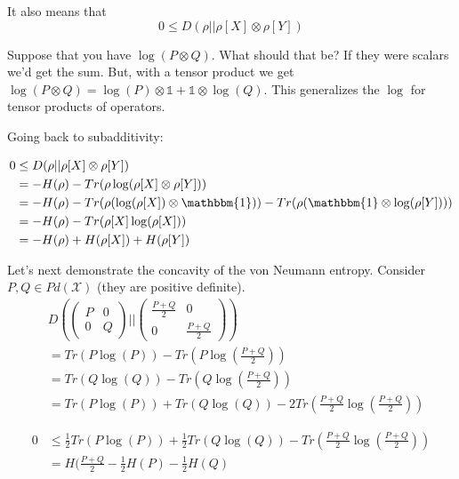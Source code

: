 \documentclass{article}
\begin{document}
        It also means that 
        \[ 
                0 \le D(\rho || \rho[X]\otimes \rho[Y]) 
        \]
        
        Suppose that you have $\log(P \otimes Q)$. What should that be?
        If they were scalars we'd get the sum. But, with a tensor
        product we get $ \log(P\otimes Q) = \log(P)\otimes \mathbb{1} +
        \mathbb{1} \otimes \log(Q)$. This generalizes the $\log$ for
        tensor products of operators.

        Going back to subadditivity:

        \begin{align*}
            0 & \le D(\rho || \rho[X] \otimes \rho[Y]) \\
              & = -H(\rho) - Tr(\rho \log(\rho[X]\otimes \rho[Y])) \\
              & = -H(\rho) - Tr(\rho(\log(\rho[X])\otimes \mathbbm{1})) -
            Tr(\rho(\mathbbm{1} \otimes \log(\rho[Y])))
            \\
            & = -H(\rho) - Tr(\rho[X]\log(\rho[X])) \\
            & = -H(\rho) + H(\rho[X]) + H(\rho[Y]) 
        \end{align*}
        
        Let's next demonstrate the concavity of the von Neumann entropy.
        Consider $ P,Q \in Pd(\mathcal{X})$ (they are positive
        definite).
        \begin{align}
            & D\left(\begin{pmatrix} P & 0 \\ 0 & Q \end{pmatrix} ||
    \begin{pmatrix} \frac{P+Q}{2} & 0 \\ 0 & \frac{P+Q}{2}
    \end{pmatrix}\right) \\
        & = Tr(P \log(P)) - Tr(P\log(\frac{P+Q}{2})) \\
        & = Tr(Q \log(Q)) - Tr(Q\log(\frac{P+Q}{2})) \\
        & = Tr(P\log(P)) + Tr(Q\log(Q)) - 2 Tr(\frac{P+Q}{2}
    \log(\frac{P+Q}{2}))
        \end{align}

        \begin{align}
            0 &\le \frac{1}{2}Tr(P\log(P)) + \frac{1}{2}Tr(Q\log(Q)) -
            Tr(\frac{P+Q}{2} \log(\frac{P+Q}{2})) \\
            & = H(\frac{P+Q}{2} - \frac{1}{2}H(P) - \frac{1}{2}H(Q)
        \end{align}
\end{document}
